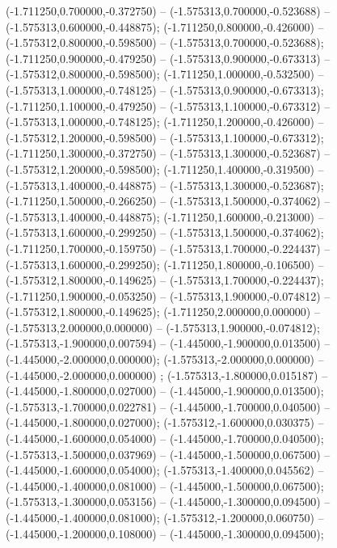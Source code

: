  (-1.711250,0.700000,-0.372750) -- (-1.575313,0.700000,-0.523688) -- (-1.575313,0.600000,-0.448875);
 (-1.711250,0.800000,-0.426000) -- (-1.575312,0.800000,-0.598500) -- (-1.575313,0.700000,-0.523688);
 (-1.711250,0.900000,-0.479250) -- (-1.575313,0.900000,-0.673313) -- (-1.575312,0.800000,-0.598500);
 (-1.711250,1.000000,-0.532500) -- (-1.575313,1.000000,-0.748125) -- (-1.575313,0.900000,-0.673313);
 (-1.711250,1.100000,-0.479250) -- (-1.575313,1.100000,-0.673312) -- (-1.575313,1.000000,-0.748125);
 (-1.711250,1.200000,-0.426000) -- (-1.575312,1.200000,-0.598500) -- (-1.575313,1.100000,-0.673312);
 (-1.711250,1.300000,-0.372750) -- (-1.575313,1.300000,-0.523687) -- (-1.575312,1.200000,-0.598500);
 (-1.711250,1.400000,-0.319500) -- (-1.575313,1.400000,-0.448875) -- (-1.575313,1.300000,-0.523687);
 (-1.711250,1.500000,-0.266250) -- (-1.575313,1.500000,-0.374062) -- (-1.575313,1.400000,-0.448875);
 (-1.711250,1.600000,-0.213000) -- (-1.575313,1.600000,-0.299250) -- (-1.575313,1.500000,-0.374062);
 (-1.711250,1.700000,-0.159750) -- (-1.575313,1.700000,-0.224437) -- (-1.575313,1.600000,-0.299250);
 (-1.711250,1.800000,-0.106500) -- (-1.575312,1.800000,-0.149625) -- (-1.575313,1.700000,-0.224437);
 (-1.711250,1.900000,-0.053250) -- (-1.575313,1.900000,-0.074812) -- (-1.575312,1.800000,-0.149625);
 (-1.711250,2.000000,0.000000) -- (-1.575313,2.000000,0.000000) -- (-1.575313,1.900000,-0.074812);
 (-1.575313,-1.900000,0.007594) -- (-1.445000,-1.900000,0.013500) -- (-1.445000,-2.000000,0.000000);
 (-1.575313,-2.000000,0.000000) -- (-1.445000,-2.000000,0.000000) ;
 (-1.575313,-1.800000,0.015187) -- (-1.445000,-1.800000,0.027000) -- (-1.445000,-1.900000,0.013500);
 (-1.575313,-1.700000,0.022781) -- (-1.445000,-1.700000,0.040500) -- (-1.445000,-1.800000,0.027000);
 (-1.575312,-1.600000,0.030375) -- (-1.445000,-1.600000,0.054000) -- (-1.445000,-1.700000,0.040500);
 (-1.575313,-1.500000,0.037969) -- (-1.445000,-1.500000,0.067500) -- (-1.445000,-1.600000,0.054000);
 (-1.575313,-1.400000,0.045562) -- (-1.445000,-1.400000,0.081000) -- (-1.445000,-1.500000,0.067500);
 (-1.575313,-1.300000,0.053156) -- (-1.445000,-1.300000,0.094500) -- (-1.445000,-1.400000,0.081000);
 (-1.575312,-1.200000,0.060750) -- (-1.445000,-1.200000,0.108000) -- (-1.445000,-1.300000,0.094500);
